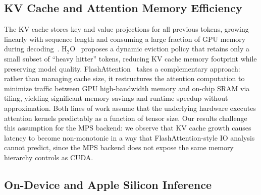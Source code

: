 \documentclass{article}
\begin{document}
\subsection{KV Cache and Attention Memory Efficiency}

The KV cache stores key and value projections for all previous tokens, growing linearly with sequence length and consuming a large fraction of GPU memory during decoding~\cite{zhang2023h2o}.
H$_2$O~\cite{zhang2023h2o} proposes a dynamic eviction policy that retains only a small subset of ``heavy hitter'' tokens, reducing KV cache memory footprint while preserving model quality.
FlashAttention~\cite{dao2022flashattention} takes a complementary approach: rather than managing cache size, it restructures the attention computation to minimize traffic between GPU high-bandwidth memory and on-chip SRAM via tiling, yielding significant memory savings and runtime speedup without approximation.
Both lines of work assume that the underlying hardware executes attention kernels predictably as a function of tensor size.
Our results challenge this assumption for the MPS backend: we observe that KV cache growth causes latency to become non-monotonic in a way that FlashAttention-style IO analysis cannot predict, since the MPS backend does not expose the same memory hierarchy controls as CUDA.

\subsection{On-Device and Apple Silicon Inference}
\end{document}
